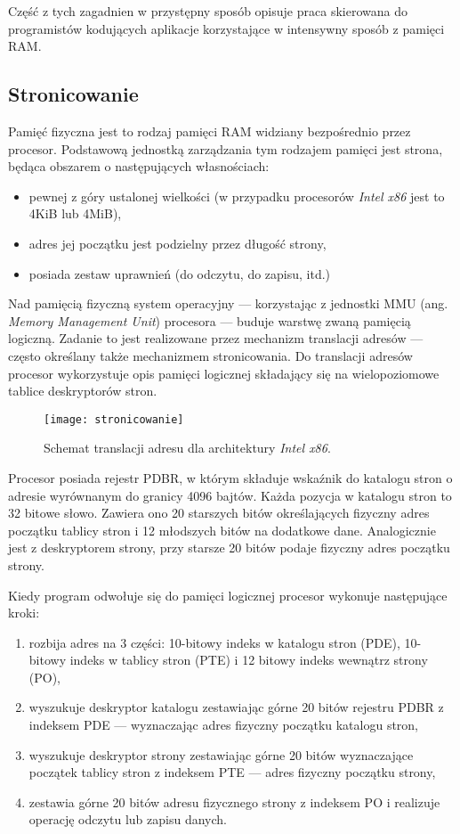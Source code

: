 \documentclass[12pt,a4paper,titlepage,twoside]{mwart}
\begin{document}
Część z tych zagadnien w przystępny sposób opisuje praca \cite{pas02memory}
skierowana do programistów kodujących aplikacje korzystające w intensywny
sposób z pamięci RAM.

\subsection{Stronicowanie}

Pamięć fizyczna jest to rodzaj pamięci RAM widziany bezpośrednio przez
procesor. Podstawową jednostką zarządzania tym rodzajem pamięci jest strona,
będąca obszarem o następujących własnościach:

\begin{itemize}
\item pewnej z góry ustalonej wielkości (w przypadku procesorów \textit{Intel
x86} jest to 4KiB lub 4MiB),
\item adres jej początku jest podzielny przez długość strony,
\item posiada zestaw uprawnień (do odczytu, do zapisu, itd.)
\end{itemize}

Nad pamięcią fizyczną system operacyjny --- korzystając z jednostki MMU (ang.
\textit{Memory Management Unit}) procesora --- buduje warstwę zwaną pamięcią
logiczną. Zadanie to jest realizowane przez mechanizm translacji adresów ---
często określany także mechanizmem stronicowania. Do translacji adresów
procesor wykorzystuje opis pamięci logicznej składający się na wielopoziomowe
tablice deskryptorów stron.

\begin{figure}[h]
\centering
\texttt{[image: stronicowanie]}
\caption{Schemat translacji adresu dla architektury \textit{Intel x86}.}
\end{figure}

Procesor posiada rejestr PDBR, w którym składuje wskaźnik do katalogu stron o
adresie wyrównanym do granicy 4096 bajtów. Każda pozycja w katalogu stron to 32
bitowe słowo. Zawiera ono 20 starszych bitów określających fizyczny adres
początku tablicy stron i 12 młodszych bitów na dodatkowe dane.  Analogicznie
jest z deskryptorem strony, przy starsze 20 bitów podaje fizyczny adres
początku strony.

Kiedy program odwołuje się do pamięci logicznej procesor wykonuje następujące kroki:
\begin{enumerate}
\item rozbija adres na 3 części: 10-bitowy indeks w katalogu stron (PDE), 10-bitowy
indeks w tablicy stron (PTE) i 12 bitowy indeks wewnątrz strony (PO),
\item wyszukuje deskryptor katalogu zestawiając górne 20 bitów rejestru PDBR z
indeksem PDE --- wyznaczając adres fizyczny początku katalogu stron,
\item wyszukuje deskryptor strony zestawiając górne 20 bitów wyznaczające
początek tablicy stron z indeksem PTE --- adres fizyczny początku strony,
\item zestawia górne 20 bitów adresu fizycznego strony z indeksem PO i
realizuje operację odczytu lub zapisu danych.
\end{enumerate}
\end{document}
